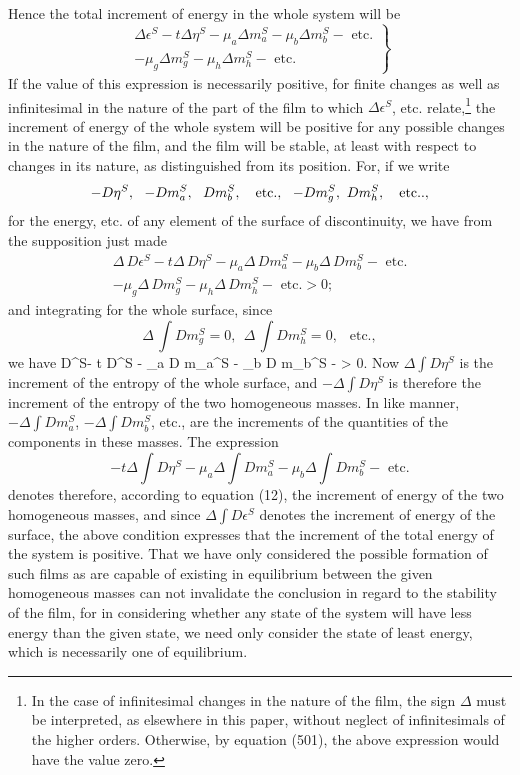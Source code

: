 \documentclass[12pt]{memoir}
\begin{document}
{Hence the total increment of energy in the whole system will be
\begin{equation}\left. \begin{array}{r} \Delta\epsilon^S- t \Delta \eta^S - \mu_a \Delta m_a^S - \mu_b \Delta m_b^S - \text{ etc.} \\
-  \mu_g \Delta m_g^S - \mu_h \Delta m_h^S- \text{ etc.} \label{516} \end{array} \right\}\end{equation}
If the value of this expression is necessarily positive, for finite changes as well as infinitesimal in the nature of the part of the film to which $\Delta\epsilon^S$, etc. relate,\footnote{In the case of infinitesimal changes in the nature of the film, the sign $\Delta$ must be interpreted, as elsewhere in this paper, without neglect of infinitesimals of the higher orders. Otherwise, by equation (501), the above expression would have the value zero.} the increment of energy of the whole system will be positive for any possible changes in the nature of the film, and the film will be stable, at least with respect to changes in its nature, as distinguished from its position. For, if we write
$$ -D \eta^S, \ \ -D m_a^S,\ \ D m_b^S, \ \ \text{ etc.}, \ \ -D m_g^S, \ \-D m_h^S, \ \ \text{ etc.}.,$$
for the energy, etc. of any element of the surface of discontinuity, we have from the supposition just made
\begin{align}\Delta\, D\epsilon^S- t \Delta \, D\eta^S - \mu_a \Delta \, D m_a^S - \mu_b \Delta \, D m_b^S - \text{ etc.} \nonumber \\
- \mu_g \Delta \, D m_g^S - \mu_h \Delta \, D m_h^S- \text{ etc.}> 0;          \label{517}\end{align}
and integrating for the whole surface, since
$$ \Delta \, \int D m_g^S = 0,\ \ \Delta \, \int D m_h^S = 0,\ \ \text{ etc.}, $$
we have
\eqs \Delta \int D\epsilon^S- t \Delta \int D\eta^S - \mu_a \Delta \int D m_a^S - \mu_b \Delta \int D m_b^S -  > 0.   \label{518} \eqe
Now $\Delta \int D\eta^S$ is the increment of the entropy of the whole surface, and $- \Delta \int D\eta^S$ is therefore the increment of the entropy of the two homogeneous masses. In like manner, $- \Delta \int D m_a^S$, $- \Delta \int D m_b^S$, etc., are the increments of the quantities of the components in these masses. The expression
$$ - t \Delta \int D\eta^S - \mu_a \Delta \int D m_a^S - \mu_b \Delta \int D m_b^S - \text{ etc.} $$
denotes therefore, according to equation (12), the increment of energy of the two homogeneous masses, and since $\Delta \int D\epsilon^S$ denotes the
increment of energy of the surface, the above condition expresses that the increment of the total energy of the system is positive. That we have only considered the possible formation of such films as are capable of existing in equilibrium between the given homogeneous masses can not invalidate the conclusion in regard to the stability of the film, for in considering whether any state of the system will have less energy than the given state, we need only consider the state of least energy, which is necessarily one of equilibrium.

}
\end{document}
